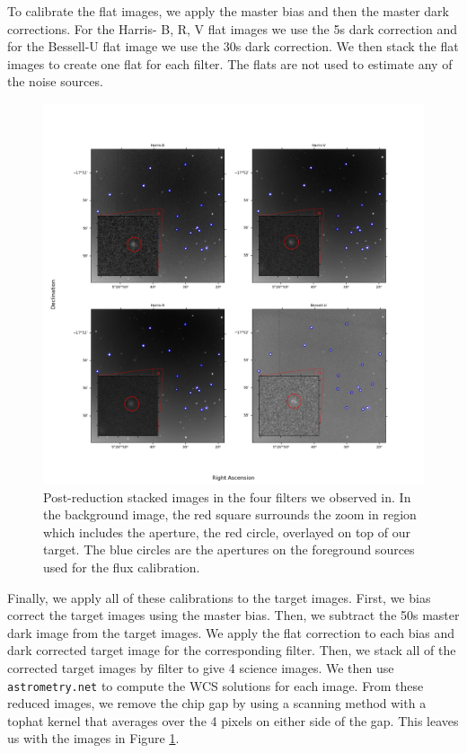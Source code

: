 \documentclass{aastex631}
\begin{document}
To calibrate the flat images, we apply the master bias and then the master dark corrections. For the Harris- B, R, V flat images we use the 5s dark correction and for the Bessell-U flat image we use the 30s dark correction. We then stack the flat images to create one flat for each filter. The flats are not used to estimate any of the noise sources.

\begin{figure}[!h]
  \includegraphics[width=\textwidth]{../analysis/fcal-images.png}
  \caption{Post-reduction stacked images in the four filters we observed in. In the background image, the red square surrounds the zoom in region which includes the aperture, the red circle, overlayed on top of our target. The blue circles are the apertures on the foreground sources used for the flux calibration.}
  \label{fig:targ}
\end{figure}

Finally, we apply all of these calibrations to the target images. First, we bias correct the target images using the master bias. Then, we subtract the 50s master dark image from the target images. We apply the flat correction to each bias and dark corrected target image for the corresponding filter. Then, we stack all of the corrected target images by filter to give 4 science images. We then use \texttt{astrometry.net} to compute the WCS solutions for each image. From these reduced images, we remove the chip gap by using a scanning method with a tophat kernel that averages over the 4 pixels on either side of the gap. This leaves us with the images in Figure \ref{fig:targ}. 
\end{document}
